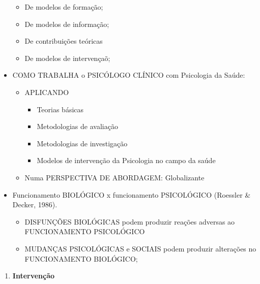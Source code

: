 \documentclass[
]{book}
\providecommand{\tightlist}{%
  \setlength{\itemsep}{0pt}\setlength{\parskip}{0pt}}
\begin{document}
\begin{itemize}
  \begin{itemize}
  \tightlist
  \item
    De modelos de formação;
  \item
    De modelos de informação;
  \item
    De contribuições teóricas
  \item
    De modelos de intervençaõ;
  \end{itemize}
\item
  COMO TRABALHA o PSICÓLOGO CLÍNICO com Psicologia da Saúde:

  \begin{itemize}
  \tightlist
  \item
    APLICANDO

    \begin{itemize}
    \tightlist
    \item
      Teorias básicas
    \item
      Metodologias de avaliação
    \item
      Metodologias de investigação
    \item
      Modelos de intervenção da Psicologia no campo da saúde
    \end{itemize}
  \item
    Numa PERSPECTIVA DE ABORDAGEM: Globalizante
  \end{itemize}
\item
  Funcionamento BIOLÓGICO x funcionamento PSICOLÓGICO (Roessler \& Decker, 1986).

  \begin{itemize}
  \tightlist
  \item
    DISFUNÇÕES BIOLÓGICAS podem produzir reações adversas ao FUNCIONAMENTO PSICOLÓGICO
  \item
    MUDANÇAS PSICOLÓGICAS e SOCIAIS podem produzir alterações no FUNCIONAMENTO BIOLÓGICO;
  \end{itemize}
\end{itemize}

\begin{enumerate}
\def\labelenumi{\arabic{enumi}.}
\setcounter{enumi}{2}
\tightlist
\item
  \textbf{Intervenção}
\end{enumerate}
\end{document}
